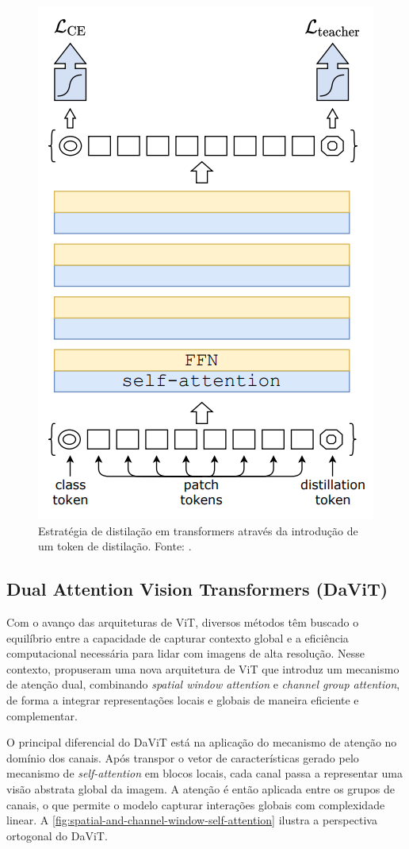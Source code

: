 \begin{figure}
    \centering
    \includegraphics[width=0.5\linewidth]{figs/distillation-procedure-deit.png}
    \caption{Estratégia de distilação em transformers através da introdução de um token de distilação. Fonte: \cite{Touvron2021}.}
    \label{fig:distillation-procedure}
\end{figure}

\subsection{Dual Attention Vision Transformers (DaViT)}

Com o avanço das arquiteturas de ViT, diversos métodos têm buscado o equilíbrio entre a capacidade de capturar contexto global e a eficiência computacional necessária para lidar com imagens de alta resolução. Nesse contexto, \cite{ding2022davitdualattentionvision} propuseram uma nova arquitetura de ViT que introduz um mecanismo de atenção dual, combinando \textit{spatial window attention} e \textit{channel group attention}, de forma a integrar representações locais e globais de maneira eficiente e complementar.

O principal diferencial do DaViT está na aplicação do mecanismo de atenção no domínio dos canais. Após transpor o vetor de características gerado pelo mecanismo de \textit{self-attention} em blocos locais, cada canal passa a representar uma visão abstrata global da imagem. A atenção é então aplicada entre os grupos de canais, o que permite o modelo capturar interações globais com complexidade linear. A \autoref{fig:spatial-and-channel-window-self-attention} ilustra a perspectiva ortogonal do DaViT.

